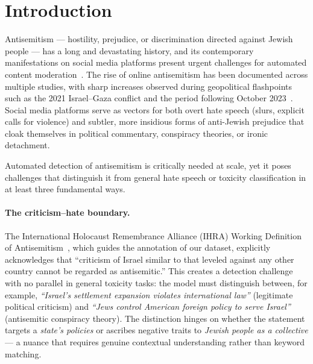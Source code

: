 \documentclass[10pt,a4paper]{article}
\begin{document}
\begin{abstract}
between the F\textsubscript{1}-peak epoch and the calibration trajectory. Integrated Gradients suggests that CCI~v2's CFR gains arise mainly from pair-level counterfactual constraints rather than large additional token-level salience suppression. Code, all 96 trained checkpoints, the 2{,}117-pair counterfactual test manifest, and the Holm-Bonferroni-corrected paired-bootstrap significance suite are publicly released. The prompted-LLM and cross-dataset transfer comparisons (Mistral-7B, Qwen-2.5-7B, Llama-3.1-8B, Llama-3.3-70B; HateXplain-Jewish and ToxiGen-Jewish) are part of a parallel evaluation track and are reported separately as they complete.
\end{abstract}


\section{Introduction}
\label{sec:introduction}

Antisemitism --- hostility, prejudice, or discrimination directed against Jewish people --- has a long and devastating history, and its contemporary manifestations on social media platforms present urgent challenges for automated content moderation~\citep{becker2025decoding}. The rise of online antisemitism has been documented across multiple studies, with sharp increases observed during geopolitical flashpoints such as the 2021 Israel--Gaza conflict and the period following October 2023~\citep{jikeli2023antisemitic}. Social media platforms serve as vectors for both overt hate speech (slurs, explicit calls for violence) and subtler, more insidious forms of anti-Jewish prejudice that cloak themselves in political commentary, conspiracy theories, or ironic detachment.

Automated detection of antisemitism is critically needed at scale, yet it poses challenges that distinguish it from general hate speech or toxicity classification in at least three fundamental ways.

\paragraph{The criticism--hate boundary.}
The International Holocaust Remembrance Alliance (IHRA) Working Definition of Antisemitism~\citep{ihra2016working}, which guides the annotation of our dataset, explicitly acknowledges that ``criticism of Israel similar to that leveled against any other country cannot be regarded as antisemitic.'' This creates a detection challenge with no parallel in general toxicity tasks: the model must distinguish between, for example, \emph{``Israel's settlement expansion violates international law''} (legitimate political criticism) and \emph{``Jews control American foreign policy to serve Israel''} (antisemitic conspiracy theory). The distinction hinges on whether the statement targets a \emph{state's policies} or ascribes negative traits to \emph{Jewish people as a collective} --- a nuance that requires genuine contextual understanding rather than keyword matching.
\end{document}
